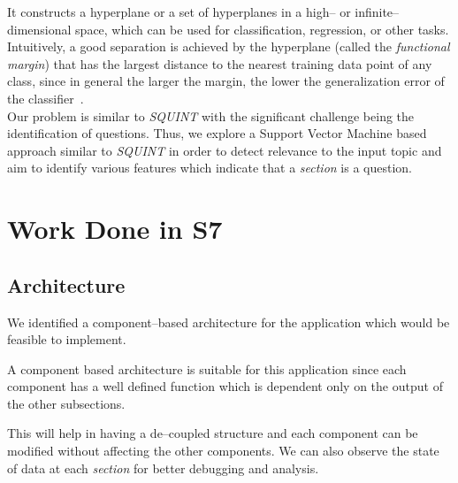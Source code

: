 \documentclass[a4paper,10pt]{report}
\begin{document}
It constructs a hyperplane or a set of hyperplanes in a high-- or infinite--dimensional space, which can be used for classification, regression, or other tasks. Intuitively, a good separation is achieved by the hyperplane (called the \emph{functional margin}) that has the largest distance to the nearest training data point of any class, since in general the larger the margin, the lower the generalization error of the classifier~\cite{wikiSVM}. \\

\noindent Our problem is similar to \emph{SQUINT} with the significant challenge being the identification of questions. Thus, we explore a Support Vector Machine based approach similar to \emph{SQUINT} in order to detect relevance to the input topic and aim to identify various features which indicate that a \emph{section} is a question.


\part{Work Done in S7}

\chapter{Architecture}

We identified a component--based architecture for the application which would be feasible to implement. 

A component based architecture is suitable for this application since each component has a well defined function which is dependent only on the output of the other subsections.

This will help in having a de--coupled structure and each component can be modified without affecting the other components. We can also observe the state of data at each \emph{section} for better debugging and analysis.\\

\end{document}
